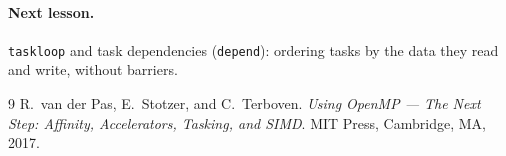\documentclass[11pt,a4paper]{article}
\let\origtexttt\texttt
\renewcommand{\texttt}[1]{\textcolor{black!60}{\origtexttt{#1}}}
\begin{document}
\paragraph{Next lesson.} \texttt{taskloop} and task dependencies (\texttt{depend}): ordering
tasks by the data they read and write, without barriers.

\begin{thebibliography}{9}
 R.~van der Pas, E.~Stotzer, and C.~Terboven. \emph{Using OpenMP --- The Next
  Step: Affinity, Accelerators, Tasking, and SIMD}. MIT Press, Cambridge, MA, 2017.
\end{thebibliography}
\end{document}
